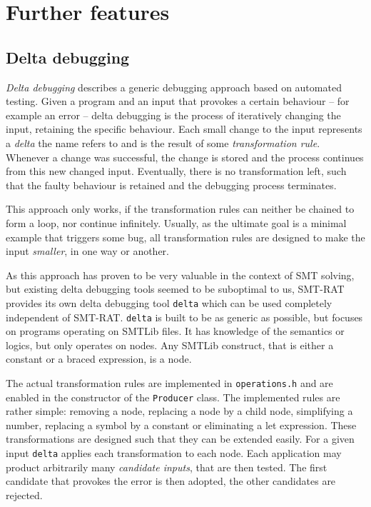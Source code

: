 \chapter{Further features}
\label{chapter:further_features}

\section{Delta debugging}
\emph{Delta debugging} describes a generic debugging approach based on automated testing.
Given a program and an input that provokes a certain behaviour -- for example an error -- delta debugging is the process of iteratively changing the input, retaining the specific behaviour.
Each small change to the input represents a \emph{delta} the name refers to and is the result of some \emph{transformation rule}.
Whenever a change was successful, the change is stored and the process continues from this new changed input.
Eventually, there is no transformation left, such that the faulty behaviour is retained and the debugging process terminates.

This approach only works, if the transformation rules can neither be chained to form a loop, nor continue infinitely.
Usually, as the ultimate goal is a minimal example that triggers some bug, all transformation rules are designed to make the input \emph{smaller}, in one way or another.

As this approach has proven to be very valuable in the context of SMT solving, but existing delta debugging tools seemed to be suboptimal to us, SMT-RAT provides its own delta debugging tool \texttt{delta} which can be used completely independent of SMT-RAT.
\texttt{delta} is built to be as generic as possible, but focuses on programs operating on SMTLib files.
It has knowledge of the semantics or logics, but only operates on nodes. Any SMTLib construct, that is either a constant or a braced expression, is a node.

The actual transformation rules are implemented in \texttt{operations.h} and are enabled in the constructor of the \texttt{Producer} class.
The implemented rules are rather simple: removing a node, replacing a node by a child node, simplifying a number, replacing a symbol by a constant or eliminating a let expression.
These transformations are designed such that they can be extended easily.
For a given input \texttt{delta} applies each transformation to each node.
Each application may product arbitrarily many \emph{candidate inputs}, that are then tested. The first candidate that provokes the error is then adopted, the other candidates are rejected.


